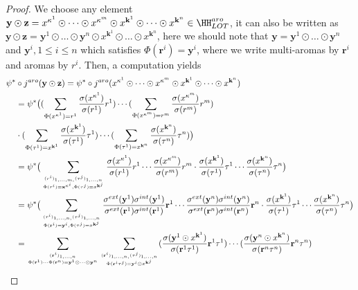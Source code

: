 \documentclass[a4paper,11pt]{article}
\begin{document}
\begin{proof}
We choose any element $\mathbf y \odot \mathbf z = x^{\kappa^1}\odot \dots \odot x^{\kappa^m}\odot x^{\mathbf k^1}\odot \dots \odot x^{\mathbf k^n}\in \HH_{LOT}^{aro}$, it can also be written as $\mathbf y \odot \mathbf z= \mathbf y^1 \odot \dots \odot \mathbf y^n \odot x^{\mathbf k^1}\odot \dots \odot x^{\mathbf k^n}$, here we should note that $\mathbf y=\mathbf y^1\odot \dots \odot \mathbf y^n$ and $\mathbf y^i, 1\leq i\leq n$ which satisfies $\Phi(\mathbf r^i)=\mathbf y^i$, where we write multi-aromas by $\mathbf r^i$ and aromas by $r^i$.
Then, a computation yields
\begin{align*}
\psi^*&\circ j^{aro}(\mathbf y \odot \mathbf z)
= \psi^*\circ j^{aro}(x^{\kappa^1}\odot \cdots \odot x^{\kappa^m}\odot x^{\mathbf k^1}\odot \cdots \odot x^{\mathbf k^n})\\
&= \psi^* \big((\sum_{\Phi(x^{\kappa^1})=r^1}\frac{\sigma(x^{\kappa^1})}{\sigma(r^1)}r^1)\cdots (\sum_{\Phi(x^{\kappa^m})=r^m}\frac{\sigma(x^{\kappa^m})}{\sigma(r^m)}r^m) \\
& \cdot (\sum_{\Phi(\tau^1)=x^{\mathbf k^1}}\frac{\sigma(x^{\mathbf k^1})}{\sigma(\tau^1)}\tau^1) \cdots (\sum_{\Phi(\tau^1)=x^{\mathbf k^n}}\frac{\sigma(x^{\mathbf k^n})}{\sigma(\tau^n)}\tau^n)\big)\\
&=\psi^* \big(\sum_{\genfrac{}{}{0pt}{2}{(r^i)_{1,\ldots, m, }(\tau^j)_{1, \ldots, n}}  {\Phi(r^i)=\mathbf x^{\mathbf \kappa^i}, \Phi(\tau^j)=x^{\mathbf k^j}}}\frac{\sigma(x^{\kappa^1})}{\sigma(r^1)}r^1\cdots \frac{\sigma(x^{\kappa^m})}{\sigma(r^m)}r^m\cdot \frac{\sigma(x^{\mathbf k^1})}{\sigma(\tau^1)}\tau^1\cdots \frac{\sigma(x^{\mathbf k^n})}{\sigma(\tau^n)}\tau^n\big)\\
&= \psi^* \big(\sum_{\genfrac{}{}{0pt}{2}{(\mathbf \mathbf r^i)_{1,\ldots, n, }(\tau^j)_{1, \ldots, n}}  {\Phi(\mathbf r^i)=\mathbf y^i, \Phi(\tau^j)=x^{\mathbf k^j}}}\frac{\sigma^{ext}(\mathbf y^1)\sigma^{int}(\mathbf y^1)}{\sigma^{ext}(\mathbf r^1)\sigma^{int}(\mathbf r^1)}\mathbf r^1\cdots \frac{\sigma^{ext}(\mathbf y^n)\sigma^{int}(\mathbf y^n)}{\sigma^{ext}(\mathbf r^n)\sigma^{int}(\mathbf r^n)}\mathbf r^n\cdot \frac{\sigma(x^{\mathbf k^1})}{\sigma(\tau^1)}\tau^1\cdots \frac{\sigma(x^{\mathbf k^n})}{\sigma(\tau^n)}\tau^n\big)\\
& =\sum_{\genfrac{}{}{0pt}{2}{(\mathbf r^i)_{1,\ldots, n }}{\Phi(\mathbf r^1)\cdots \Phi(\mathbf r^n)=\mathbf y^1\odot \cdots \odot \mathbf y^n}} \sum_{\genfrac{}{}{0pt}{2}{(\mathbf r^i)_{1,\ldots, n, }(\tau^j)_{1, \ldots, n}}  {\Phi(\mathbf r^i \tau^j)=\mathbf y^i\odot x^{\mathbf k^j}}}(\frac{\sigma(\mathbf y^1 \odot x^{\mathbf k^1})}{\sigma(\mathbf r^1\tau^1)}\mathbf r^1\tau^1) \cdots (\frac{\sigma(\mathbf y^n \odot x^{\mathbf k^n})}{\sigma(\mathbf r^n\tau^n)}\mathbf r^n\tau^n)\\

\end{align*}
\end{proof}
\end{document}
